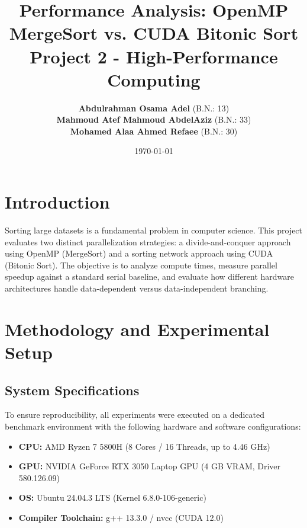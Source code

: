 \documentclass[12pt, a4paper]{article}
\begin{document}
\title{\textbf{Performance Analysis: OpenMP MergeSort vs. CUDA Bitonic Sort}\\
\vspace{0.5em}
\Large Project 2 - High-Performance Computing}

\author{
    \textbf{Abdulrahman Osama Adel} (B.N.: 13) \\
    \textbf{Mahmoud Atef Mahmoud AbdelAziz} (B.N.: 33) \\
    \textbf{Mohamed Alaa Ahmed Refaee} (B.N.: 30) 
}
\date{\today}

\maketitle


\vspace{1em}

\section{Introduction}
Sorting large datasets is a fundamental problem in computer science. This project evaluates two distinct parallelization strategies: a divide-and-conquer approach using OpenMP (MergeSort) and a sorting network approach using CUDA (Bitonic Sort). The objective is to analyze compute times, measure parallel speedup against a standard serial baseline, and evaluate how different hardware architectures handle data-dependent versus data-independent branching.

\section{Methodology and Experimental Setup}

\subsection{System Specifications}
To ensure reproducibility, all experiments were executed on a dedicated benchmark environment with the following hardware and software configurations:
\begin{itemize}
    \item \textbf{CPU:} AMD Ryzen 7 5800H (8 Cores / 16 Threads, up to 4.46 GHz)
    \item \textbf{GPU:} NVIDIA GeForce RTX 3050 Laptop GPU (4 GB VRAM, Driver 580.126.09)
    \item \textbf{OS:} Ubuntu 24.04.3 LTS (Kernel 6.8.0-106-generic)
    \item \textbf{Compiler Toolchain:} g++ 13.3.0 / nvcc (CUDA 12.0)
\end{itemize}
\end{document}
